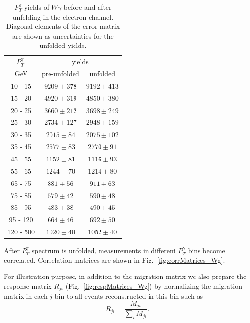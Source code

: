 \begin{table}[h]
  \scriptsize
  \begin{center}
  \caption{$P_T^{\gamma}$ yields of $W\gamma$ before and after unfolding in the electron channel. Diagonal elements of the error matrix are shown as uncertainties for the unfolded yields.}
  \begin{tabular}{|c|c|c|}
\hline
  $P_T^{\gamma}$, &    \multicolumn{2}{|c|}{yields}  \\ 
  GeV           &  pre-unfolded &  unfolded  \\ \hline

 10 -  15 &     $9209\pm 378$ &     $9192\pm 413$  \\ \hline
 15 -  20 &     $4920\pm 319$ &     $4850\pm 380$  \\ \hline
 20 -  25 &     $3660\pm 212$ &     $3698\pm 249$  \\ \hline
 25 -  30 &     $2734\pm 127$ &     $2948\pm 159$  \\ \hline
 30 -  35 &     $2015\pm  84$ &     $2075\pm 102$  \\ \hline
 35 -  45 &     $2677\pm  83$ &     $2770\pm  91$  \\ \hline
 45 -  55 &     $1152\pm  81$ &     $1116\pm  93$  \\ \hline
 55 -  65 &     $1244\pm  70$ &     $1214\pm  80$  \\ \hline
 65 -  75 &     $881\pm  56$ &     $911\pm  63$  \\ \hline
 75 -  85 &     $579\pm  42$ &     $590\pm  48$  \\ \hline
 85 -  95 &     $483\pm  38$ &     $490\pm  45$  \\ \hline
 95 - 120 &     $664\pm  46$ &     $692\pm  50$  \\ \hline
120 - 500 &     $1020\pm  40$ &     $1052\pm  40$  \\ \hline
  \end{tabular}
  \label{tab:unf_results_ELECTRON_WGamma}
  \end{center}
\end{table}

After $P_T^{\gamma}$ spectrum is unfolded, measurements in different $P_T^{\gamma}$ bins become correlated. Correlation matrices are shown in Fig.~\ref{fig:corrMatrices_Wg}. 

For illustration purpose, in addition to the migration matrix we also prepare the response matrix $R_{ji}$ (Fig.~\ref{fig:respMatrices_Wg}) by normalizing the migration matrix in each $j$ bin to all events reconstructed in this bin such as 
\begin{equation}
R_{ji} = \frac{M_{ji}}{\sum_{i} M_{ji}}. 
\end{equation}

